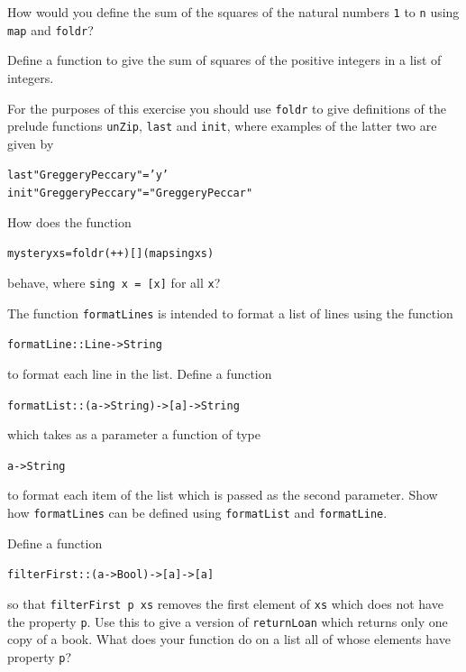 \begin{exercises}

\item
How would you define the sum of the squares of the natural numbers \texttt{1} to
\texttt{n} using \texttt{map} and \texttt{foldr}?

\item
Define a function to give the sum of squares of the positive
integers in a list of integers.

\item
For the purposes of this exercise you should use \texttt{foldr} to
give definitions of the prelude functions
\texttt{unZip}, \texttt{last} and \texttt{init}, where examples of the
latter two
are given by
\begin{alltt}
last "Greggery Peccary" = 'y'
init "Greggery Peccary" = "Greggery Peccar"
\end{alltt}


\item
How does the function
\begin{alltt}
mystery xs = foldr (++) [] (map sing xs)
\end{alltt}
behave, where \texttt{sing x = [x]} for all \texttt{x}?

\item
The function \texttt{formatLines} is intended to format a list of lines using the function
\begin{alltt}
formatLine :: Line -> String
\end{alltt}
to format each line in the list. Define a function 
\begin{alltt}
formatList :: (a -> String) -> [a] -> String
\end{alltt}
which takes as a parameter a function of type
\begin{alltt}
a -> String
\end{alltt}
to format each item of the list which is passed as the second parameter. Show
how \texttt{formatLines} can be defined using \texttt{formatList} and
\texttt{formatLine}.


\item
Define a function
\begin{alltt}
filterFirst :: (a -> Bool) -> [a] -> [a]
\end{alltt}
so that \texttt{filterFirst p xs} removes the first element of \texttt{xs} which does
not have the property \texttt{p}. Use this to give a version of \texttt{returnLoan}
which returns only one copy of a book. What does your function do on a list
all of whose elements have property \texttt{p}? 


\end{exercises}
